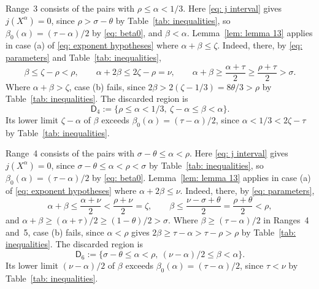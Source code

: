 \documentclass{article}
\numberwithin{equation}{section}
\newcommand{\Le}{\leqslant}
\newcommand{\Ge}{\geqslant}
\begin{document}
Range~3 consists of the pairs with $\rho \Le \alpha < 1/3$. Here \eqref{eq: j interval} gives $j(X^{\alpha}) = 0$, since $\rho > \sigma - \theta$ by Table~\ref{tab: inequalities}, so $\beta_0(\alpha) = (\tau - \alpha)/2$ by \eqref{eq: beta0}, and $\beta < \alpha$. Lemma~\ref{lem: lemma 13} applies in case (a) of \eqref{eq: exponent hypotheses} where $\alpha + \beta \Le \zeta$. Indeed, there, by \eqref{eq: parameters} and Table~\ref{tab: inequalities},
\begin{equation*}
\beta \Le \zeta - \rho < \rho, \qquad \alpha + 2\beta \Le 2\zeta - \rho = \nu, \qquad \alpha + \beta \Ge \frac{\alpha + \tau}{2} \Ge \frac{\rho + \tau}{2} > \sigma.
\end{equation*} Where $\alpha + \beta > \zeta$, case (b) fails, since $2\beta > 2(\zeta - 1/3) = 8\theta/3 > \rho$ by Table~\ref{tab: inequalities}. The discarded region is
\begin{equation}
\label{eq: D4}
\mathsf{D}_4 := \bigl\{ \rho \Le \alpha < 1/3,\ \zeta - \alpha \Le \beta < \alpha \bigr\}.
\end{equation}
Its lower limit $\zeta - \alpha$ of $\beta$ exceeds $\beta_0(\alpha) = (\tau - \alpha)/2$, since $\alpha < 1/3 < 2\zeta - \tau$ by Table~\ref{tab: inequalities}.

Range~4 consists of the pairs with $\sigma - \theta \Le \alpha < \rho$. Here \eqref{eq: j interval} gives $j(X^{\alpha}) = 0$, since $\sigma - \theta \Le \alpha < \rho < \sigma$ by Table~\ref{tab: inequalities}, so $\beta_0(\alpha) = (\tau - \alpha)/2$ by \eqref{eq: beta0}. Lemma~\ref{lem: lemma 13} applies in case (a) of \eqref{eq: exponent hypotheses} where $\alpha + 2\beta \Le \nu$. Indeed, there, by \eqref{eq: parameters},
\begin{equation*}
\alpha + \beta \Le \frac{\alpha + \nu}{2} < \frac{\rho + \nu}{2} = \zeta, \qquad \beta \Le \frac{\nu - \sigma + \theta}{2} = \frac{\rho + \theta}{2} < \rho,
\end{equation*}
and $\alpha + \beta \Ge (\alpha + \tau)/2 \Ge (1 - \theta)/2 > \sigma$. Where $\beta \Ge (\tau - \alpha)/2$ in Ranges~4 and~5, case (b) fails, since $\alpha < \rho$ gives $2\beta \Ge \tau - \alpha > \tau - \rho > \rho$ by Table~\ref{tab: inequalities}. The discarded region is
\begin{equation}
\label{eq: D6}
\mathsf{D}_6 := \bigl\{ \sigma - \theta \Le \alpha < \rho,\ (\nu - \alpha)/2 \Le \beta < \alpha \bigr\}.
\end{equation}
Its lower limit $(\nu - \alpha)/2$ of $\beta$ exceeds $\beta_0(\alpha) = (\tau - \alpha)/2$, since $\tau < \nu$ by Table~\ref{tab: inequalities}.
\end{document}

